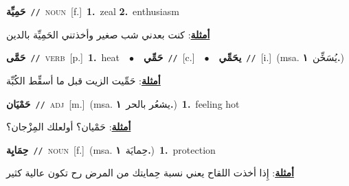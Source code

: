 \documentclass[10pt,a4paper,twoside]{article} %
\begin{document}
\begin{multicols}{2}
{\setlength\topsep{0pt}\textbf{\foreignlanguage{arabic}{حَمِيِّة}}\ {\color{gray}\texttt{//}\color{black}}\ \textsc{noun}\ [f.]\ \textbf{1.}~zeal  \textbf{2.}~enthusiasm\  \begin{flushright}\color{gray}\foreignlanguage{arabic}{\textbf{\underline{\foreignlanguage{arabic}{أمثلة}}}: كنت بعدني شب صغير وأخذتني الحَمِيِّة بالدين}\end{flushright}\color{black}} \vspace{2mm}

{\setlength\topsep{0pt}\textbf{\foreignlanguage{arabic}{حَمَّى}}\ {\color{gray}\texttt{//}\color{black}}\ \textsc{verb}\ [p.]\ \textbf{1.}~heat\ \ $\bullet$\ \ \setlength\topsep{0pt}\textbf{\foreignlanguage{arabic}{حَمِّي}}\ {\color{gray}\texttt{//}\color{black}}\ [c.]\ \ $\bullet$\ \ \setlength\topsep{0pt}\textbf{\foreignlanguage{arabic}{يحَمِّي}}\ {\color{gray}\texttt{//}\color{black}}\ [i.]\ \color{gray}(msa. \foreignlanguage{arabic}{يُسَخِّن}~\foreignlanguage{arabic}{\textbf{١.}})\color{black}\  \begin{flushright}\color{gray}\foreignlanguage{arabic}{\textbf{\underline{\foreignlanguage{arabic}{أمثلة}}}: حَمِّيت الزيت قبل ما أسقِّط الكُبِّة}\end{flushright}\color{black}} \vspace{2mm}

{\setlength\topsep{0pt}\textbf{\foreignlanguage{arabic}{حَمْيَان}}\ {\color{gray}\texttt{//}\color{black}}\ \textsc{adj}\ [m.]\ \color{gray}(msa. \foreignlanguage{arabic}{يشعُر بالحر}~\foreignlanguage{arabic}{\textbf{١.}})\color{black}\ \textbf{1.}~feeling hot\  \begin{flushright}\color{gray}\foreignlanguage{arabic}{\textbf{\underline{\foreignlanguage{arabic}{أمثلة}}}: حَمْيان؟ أولعلك المِزْجان؟}\end{flushright}\color{black}} \vspace{2mm}

{\setlength\topsep{0pt}\textbf{\foreignlanguage{arabic}{حِمَايِة}}\ {\color{gray}\texttt{//}\color{black}}\ \textsc{noun}\ [f.]\ \color{gray}(msa. \foreignlanguage{arabic}{حِمايَة}~\foreignlanguage{arabic}{\textbf{١.}})\color{black}\ \textbf{1.}~protection\  \begin{flushright}\color{gray}\foreignlanguage{arabic}{\textbf{\underline{\foreignlanguage{arabic}{أمثلة}}}: إِذا أخذت اللقاح يعني نسبة حِمايتك من المرض رح تكون عالية كثير}\end{flushright}\color{black}} \vspace{2mm}


\end{multicols}
\end{document}
